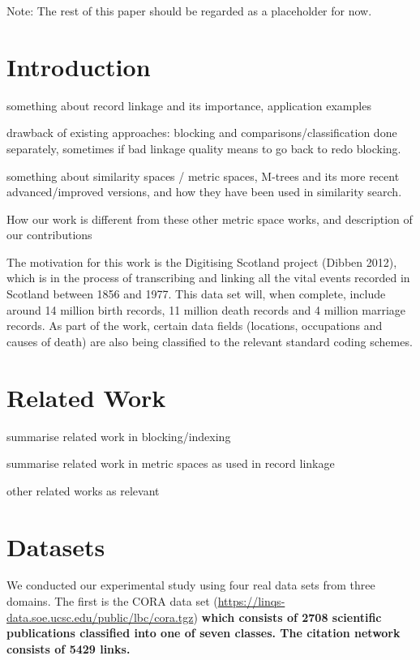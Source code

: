 \documentclass{llncs}
\begin{document}
Note: The rest of this paper should be regarded as a placeholder for now.

\section{Introduction}
\label{sec-intro}

something about record linkage and its importance, application examples

drawback of existing approaches: blocking and comparisons/classification
done separately, sometimes if bad linkage quality means to go back to redo
blocking.

something about similarity spaces / metric spaces, M-trees and its
more recent advanced/improved versions, and how they have been used in
similarity search.

How our work is different from these other metric space works, and
description of our contributions

The motivation for this work is the Digitising Scotland project (Dibben 2012), which is in the process of transcribing and linking all the vital events recorded in Scotland between 1856 and 1977. This data set will, when complete, include around 14 million birth records, 11 million death records and 4 million marriage records. As part of the work, certain data fields (locations, occupations and causes of death) are also being classified to the relevant standard coding schemes.



\section{Related Work}
\label{sec-related}

summarise related work in blocking/indexing

summarise related work in metric spaces as used in record linkage

other related works as relevant


\section{Datasets}
\label{sec-data}

We conducted our experimental study using four real data sets from three
domains. The first is the CORA data set  (\url{https://linqs-data.soe.ucsc.edu/public/lbc/cora.tgz}) \textbf{ which consists of 2708 scientific publications classified into one of seven classes. The citation network consists of 5429 links.}
\end{document}
